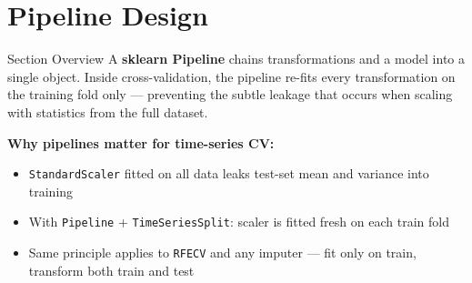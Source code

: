 \documentclass[aspectratio=169, 10pt]{beamer}
\begin{document}
\section{Pipeline Design}


\begin{frame}{Section Overview}
  A \textbf{sklearn Pipeline} chains transformations and a model
  into a single object. Inside cross-validation, the pipeline
  re-fits every transformation on the training fold only ---
  preventing the subtle leakage that occurs when scaling with
  statistics from the full dataset.

  \medskip
  \textbf{Why pipelines matter for time-series CV:}
  \begin{itemize}
    \item \texttt{StandardScaler} fitted on all data
          leaks test-set mean and variance into training
    \item With \texttt{Pipeline} + \texttt{TimeSeriesSplit}:
          scaler is fitted fresh on each train fold
    \item Same principle applies to \texttt{RFECV} and
          any imputer --- fit only on train, transform both
          train and test \parencite{Pedregosa2011}
  \end{itemize}

  \medskip
\end{frame}
\end{document}
